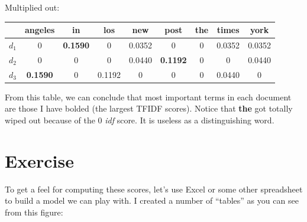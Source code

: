 \documentclass[10pt]{article}
\begin{document}
\noindent Multiplied out:
 
 \begin{table}[H]
\begin{center}
\begin{tabular}{c|c|c|c|c|c|c|c|c}
 & angeles & in & los & new & post & the & times & york\\
\hline
$d_1$ & 0 & {\bf 0.1590} & 0 & 0.0352 & 0 & 0 & 0.0352 & 0.0352 \\
$d_2$ & 0 & 0 & 0 & 0.0440 & {\bf 0.1192} & 0 & 0 & 0.0440\\
$d_3$ & {\bf 0.1590} & 0 & 0.1192 & 0 & 0 & 0 & 0.0440 & 0\\
\end{tabular}
\end{center}
\label{default}
\end{table}%

From this table, we can conclude that most important terms in each document are those I have bolded (the largest TFIDF scores). Notice that {\bf the} got totally wiped out because of the 0 {\em idf} score. It is useless as a distinguishing word.

\section{Exercise}


To get a feel for computing these scores, let's use Excel or some other spreadsheet to build a model we can play with. I created a number of ``tables'' as you can see from this figure:

\begin{figure}[H]
\begin{center}
\label{default}
\end{center}
\end{figure}
\end{document}

